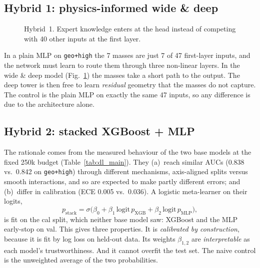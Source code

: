 \documentclass[conference]{IEEEtran}
\begin{document}
\subsection{Hybrid 1: physics-informed wide \& deep}
\begin{figure}[!t]
\centering
{}
\caption{Hybrid~1. Expert knowledge enters at the head instead of competing with 40 other inputs at
the first layer.}
\label{fig:widedeep}
\end{figure}
In a plain MLP on \texttt{geo+high} the 7 masses are just 7 of 47 first-layer inputs, and the network
must learn to route them through three non-linear layers. In the wide \& deep model
(Fig.~\ref{fig:widedeep}) the masses take a short path to the output. The deep tower is then free to
learn \emph{residual} geometry that the masses do not capture. The control is the plain MLP on
exactly the same 47 inputs, so any difference is due to the architecture alone.

\subsection{Hybrid 2: stacked XGBoost + MLP}
The rationale comes from the measured behaviour of the two base models at the fixed 250k budget
(Table~\ref{tab:dl_main}). They (a)~reach similar AUCs (0.838 vs.\ 0.842 on \texttt{geo+high})
through different mechanisms, axis-aligned splits versus smooth interactions, and so are expected to
make partly different errors; and (b)~differ in calibration (ECE 0.005 vs.\ 0.036). A logistic meta-learner on their logits,
\begin{equation}
p_\mathrm{stack}=\sigma\bigl(\beta_0+\beta_1\,\mathrm{logit}\,p_\mathrm{XGB}+\beta_2\,\mathrm{logit}\,p_\mathrm{MLP}\bigr),
\end{equation}
is fit on the cal split, which neither base model saw: XGBoost and the MLP early-stop on val. This
gives three properties. It is \emph{calibrated by construction}, because it is fit by log loss on
held-out data. Its weights $\beta_{1,2}$ are \emph{interpretable} as each model's trustworthiness.
And it cannot overfit the test set. The naive control is the unweighted average of the two
probabilities.
\end{document}
